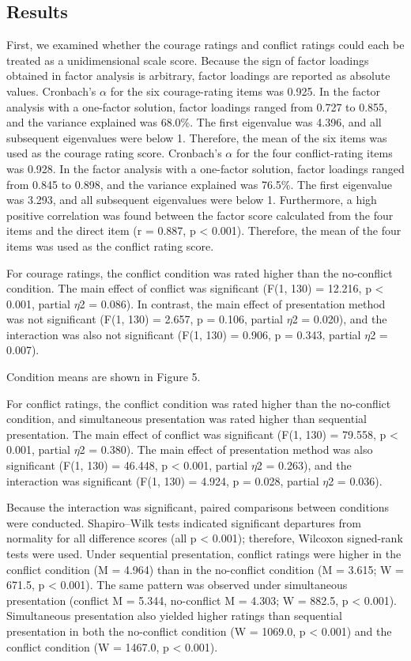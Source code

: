 \documentclass[utf8]{FrontiersinHarvard}
\begin{document}
\subsection{Results}\label{results}

First, we examined whether the courage ratings and conflict ratings could each be treated as a unidimensional scale score. Because the sign of factor loadings obtained in factor analysis is arbitrary, factor loadings are reported as absolute values. Cronbach's $\alpha$ for the six courage-rating items was 0.925. In the factor analysis with a one-factor solution, factor loadings ranged from 0.727 to 0.855, and the variance explained was 68.0\%. The first eigenvalue was 4.396, and all subsequent eigenvalues were below 1. Therefore, the mean of the six items was used as the courage rating score. Cronbach's $\alpha$ for the four conflict-rating items was 0.928. In the factor analysis with a one-factor solution, factor loadings ranged from 0.845 to 0.898, and the variance explained was 76.5\%. The first eigenvalue was 3.293, and all subsequent eigenvalues were below 1. Furthermore, a high positive correlation was found between the factor score calculated from the four items and the direct item (r = 0.887, p \textless{} 0.001). Therefore, the mean of the four items was used as the conflict rating score.

For courage ratings, the conflict condition was rated higher than the no-conflict condition. The main effect of conflict was significant (F(1, 130) = 12.216, p \textless{} 0.001, partial $\eta$2 = 0.086). In contrast, the main effect of presentation method was not significant (F(1, 130) = 2.657, p = 0.106, partial $\eta$2 = 0.020), and the interaction was also not significant (F(1, 130) = 0.906, p = 0.343, partial $\eta$2 = 0.007).

Condition means are shown in Figure 5.

For conflict ratings, the conflict condition was rated higher than the no-conflict condition, and simultaneous presentation was rated higher than sequential presentation. The main effect of conflict was significant (F(1, 130) = 79.558, p \textless{} 0.001, partial $\eta$2 = 0.380). The main effect of presentation method was also significant (F(1, 130) = 46.448, p \textless{} 0.001, partial $\eta$2 = 0.263), and the interaction was significant (F(1, 130) = 4.924, p = 0.028, partial $\eta$2 = 0.036).

Because the interaction was significant, paired comparisons between conditions were conducted. Shapiro--Wilk tests indicated significant departures from normality for all difference scores (all p \textless{} 0.001); therefore, Wilcoxon signed-rank tests were used. Under sequential presentation, conflict ratings were higher in the conflict condition (M = 4.964) than in the no-conflict condition (M = 3.615; W = 671.5, p \textless{} 0.001). The same pattern was observed under simultaneous presentation (conflict M = 5.344, no-conflict M = 4.303; W = 882.5, p \textless{} 0.001). Simultaneous presentation also yielded higher ratings than sequential presentation in both the no-conflict condition (W = 1069.0, p \textless{} 0.001) and the conflict condition (W = 1467.0, p \textless{} 0.001).
\end{document}
